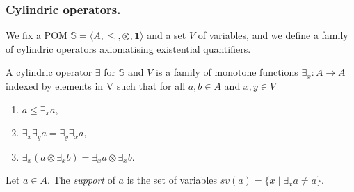 \documentclass{llncs}
\newcommand{\comment}[1]{}
\def\monid{{\mathbf 0}}
\def\monop{\otimes}
\def\monid{\mathbf{1}}
\begin{document}
\comment{\smallskip
Our first step is the introduction of a technical notion that allows for 
factorising the common properties in the definition of the two families of operators.

\begin{definition}[pomonoid action]
\label{pomo}
Let $\mathbb{M} = \langle A, \leq, \monop, \monid \rangle$ be a partially ordered monoid and $\mathbb{P} = \langle S, \leq \rangle$ a partial order.
A pomonoid action of $\mathbb{M}$ on $\mathbb{P}$ is a function $\phi: A \times S \rightarrow S$ such that
	\begin{itemize}
	     \item $\forall s \in S.\ \phi(\monid, s) = s$,
         \item $\forall a, b \in A,\ s \in S.\ \phi(a, \phi(b, s)) = \phi(a \otimes b, s)$,
         \item $\forall a, b \in A,\ s, t \in S.\ a \leq b\, \wedge\, s \leq t \implies \phi(a, s) 
         \leq \phi (b, t)$.
	\end{itemize}
\end{definition}

The first two requirements just state
that $\phi$ is a monoid action of $\mathbb{M}$ on $S$, while the latter states that $\phi$ is monotone. Sometimes, we say that $\mathbb{P}$ is an $\mathbb{M}$-PO.}

\subsubsection{Cylindric operators.}
We fix a POM $\mathbb{S} = \langle A, \leq, \monop, \monid \rangle$
and a set $V$ of variables, and we define a family of cylindric operators axiomatising existential quantifiers.

\begin{definition}\label{cyli}
	A cylindric operator $\exists$ for $\mathbb{S}$ and $V$ is a family of monotone functions
	$\exists_x : A \rightarrow A$ indexed by elements in V such that for all 
	$a, b \in A$ and $x, y \in V$
	\begin{enumerate}
	     \item $a \leq \exists_x a$,
         \item $\exists_x \exists_y a = \exists_y \exists_x a$,
	     \item $\exists_x (a \monop \exists_x b) = \exists_x a \monop \exists_x b$.
	\end{enumerate}
	
	\noindent Let $a \in A$. The \emph{support} of $a$ is the set of variables 
	$sv(a) = \{ x \mid \exists_x a \neq a\}$. 
\end{definition}
\end{document}
